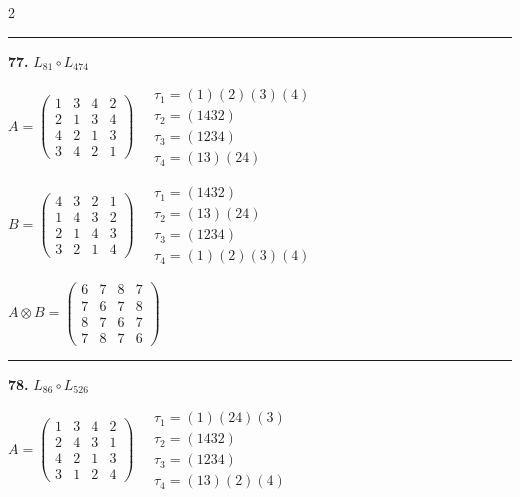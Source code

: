 \begin{multicols}{2}
\vspace{0.3em}
\hrule
\vspace{0.3em}

\noindent\textbf{77.} $L_{81} \circ L_{474}$

$A = \begin{pmatrix} 1 & 3 & 4 & 2 \\ 2 & 1 & 3 & 4 \\ 4 & 2 & 1 & 3 \\ 3 & 4 & 2 & 1 \end{pmatrix} \quad \begin{matrix} \tau_{1}=(1)(2)(3)(4) \\ \tau_{2}=(1 4 3 2) \\ \tau_{3}=(1 2 3 4) \\ \tau_{4}=(1 3)(2 4) \end{matrix}$

$B = \begin{pmatrix} 4 & 3 & 2 & 1 \\ 1 & 4 & 3 & 2 \\ 2 & 1 & 4 & 3 \\ 3 & 2 & 1 & 4 \end{pmatrix} \quad \begin{matrix} \tau_{1}=(1 4 3 2) \\ \tau_{2}=(1 3)(2 4) \\ \tau_{3}=(1 2 3 4) \\ \tau_{4}=(1)(2)(3)(4) \end{matrix}$

$A \otimes B = \begin{pmatrix} 6 & 7 & 8 & 7 \\ 7 & 6 & 7 & 8 \\ 8 & 7 & 6 & 7 \\ 7 & 8 & 7 & 6 \end{pmatrix}$

\vspace{0.3em}
\hrule
\vspace{0.3em}

\noindent\textbf{78.} $L_{86} \circ L_{526}$

$A = \begin{pmatrix} 1 & 3 & 4 & 2 \\ 2 & 4 & 3 & 1 \\ 4 & 2 & 1 & 3 \\ 3 & 1 & 2 & 4 \end{pmatrix} \quad \begin{matrix} \tau_{1}=(1)(2 4)(3) \\ \tau_{2}=(1 4 3 2) \\ \tau_{3}=(1 2 3 4) \\ \tau_{4}=(1 3)(2)(4) \end{matrix}$


\end{multicols}
